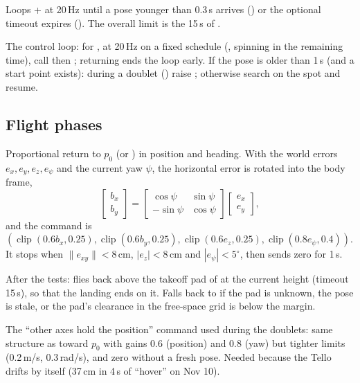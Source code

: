 Loops  +  at 20\,Hz until a pose younger than 0.3\,s arrives ()
or the optional timeout expires (). The overall limit is the 15\,s  of
.

The control loop: for , at 20\,Hz on a fixed schedule (, spinning in the
remaining time), call  then ;  returning  ends the loop early.
If the pose is older than 1\,s (and a start point exists): during a doublet () raise
; otherwise search on the spot and resume.

\subsection{Flight phases}

Proportional return to $p_0$ (or ) in position and heading. With the world errors
$e_x, e_y, e_z, e_\psi$ and the current yaw $\psi$, the horizontal error is rotated into the body frame,
$$
\begin{bmatrix} b_x \\ b_y \end{bmatrix} =
\begin{bmatrix} \cos\psi & \sin\psi \\ -\sin\psi & \cos\psi \end{bmatrix}
\begin{bmatrix} e_x \\ e_y \end{bmatrix},
$$
and the command is $(\operatorname{clip}(0.6b_x, 0.25), \operatorname{clip}(0.6b_y, 0.25),
\operatorname{clip}(0.6e_z, 0.25), \operatorname{clip}(0.8e_\psi, 0.4))$. It stops when
$\lVert e_{xy}\rVert < 8$\,cm, $|e_z|<8$\,cm and $|e_\psi|<5^\circ$, then sends zero for 1\,s.

After the tests: flies back above the takeoff pad of  at the current height (timeout
15\,s), so that the landing ends on it. Falls back to  if the pad is unknown, the pose is
stale, or the pad's clearance in the free-space grid is below the margin.

The ``other axes hold the position'' command used during the doublets: same structure as 
toward $p_0$ with gains 0.6 (position) and 0.8 (yaw) but tighter limits (0.2\,m/s, 0.3\,rad/s), and zero
without a fresh pose. Needed because the Tello drifts by itself (37\,cm in 4\,s of ``hover'' on Nov 10).


